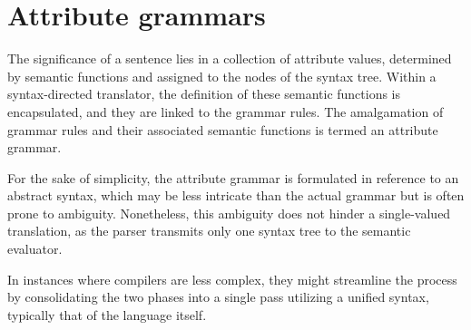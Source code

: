 \section{Attribute grammars}

The significance of a sentence lies in a collection of attribute values, determined by semantic functions and assigned to the nodes of the syntax tree. 
Within a syntax-directed translator, the definition of these semantic functions is encapsulated, and they are linked to the grammar rules. 
The amalgamation of grammar rules and their associated semantic functions is termed an attribute grammar.

For the sake of simplicity, the attribute grammar is formulated in reference to an abstract syntax, which may be less intricate than the actual grammar but is often prone to ambiguity. 
Nonetheless, this ambiguity does not hinder a single-valued translation, as the parser transmits only one syntax tree to the semantic evaluator.

In instances where compilers are less complex, they might streamline the process by consolidating the two phases into a single pass utilizing a unified syntax, typically that of the language itself.

